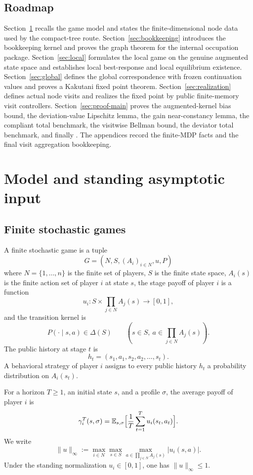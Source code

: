 \documentclass[12pt]{article}
\theoremstyle{definition}
\newcommand{\E}{\mathbb{E}}
\newcommand{\1}{\mathbf{1}}
\begin{document}
\subsection{Roadmap}



Section~\ref{sec:model} recalls the game model and states the finite-dimensional
node data used by the compact-tree route. Section~\ref{sec:bookkeeping}
introduces the bookkeeping kernel and proves the graph theorem for the internal
occupation package. Section~\ref{sec:local} formulates the local game on the
genuine augmented state space and establishes local best-response and local
equilibrium existence. Section~\ref{sec:global} defines the global correspondence
with frozen continuation values and proves a Kakutani fixed point theorem.
Section~\ref{sec:realization} defines actual node visits and realizes the fixed
point by public finite-memory visit controllers. Section~\ref{sec:proof-main}
proves the augmented-kernel bias bound, the deviation-value Lipschitz lemma, the
gain near-constancy lemma, the compliant total benchmark, the visitwise Bellman
bound, the deviator total benchmark, and finally . The
appendices record the finite-MDP facts and the final visit aggregation
bookkeeping.

\section{Model and standing asymptotic input}
\label{sec:model}

\subsection{Finite stochastic games}

A finite stochastic game is a tuple
\[
G=(N,S,(A_i)_{i\in N},u,P)
\]
where $N=\{1,\dots,n\}$ is the finite set of players, $S$ is the finite state
space, $A_i(s)$ is the finite action set of player $i$ at state $s$, the stage
payoff of player $i$ is a function
\[
u_i:S\times \prod_{j\in N}A_j(s)\to [0,1],
\]
and the transition kernel is
\[
P(\cdot\mid s,a)\in \Delta(S)
\qquad (s\in S,\ a\in \prod_{j\in N}A_j(s)).
\]
The public history at stage $t$ is
\[
h_t=(s_1,a_1,s_2,a_2,\dots,s_t).
\]
A behavioral strategy of player $i$ assigns to every public history $h_t$ a
probability distribution on $A_i(s_t)$.

For a horizon $T\ge 1$, an initial state $s$, and a profile $\sigma$, the average
payoff of player $i$ is
\[
\gamma_i^T(s,\sigma)
=
\E_{s,\sigma}\Bigl[\frac1T\sum_{t=1}^T u_i(s_t,a_t)\Bigr].
\]
We write
\[
\|u\|_\infty
:=
\max_{i\in N}\max_{s\in S}\max_{a\in\prod_{j\in N}A_j(s)} |u_i(s,a)|.
\]
Under the standing normalization $u_i\in[0,1]$, one has $\|u\|_\infty\le 1$.
\end{document}
